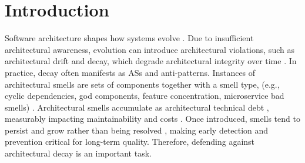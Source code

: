 \section{Introduction}
\label{s:introduction}
Software architecture shapes how systems evolve \cite{bass_SoftwareArchitecture_2021,woods_ContinuousArchitecture_2021,bogner_assuring_2019,garlan_evolution_2009,muccini_software_2021,breivold_systematic_2012}.
Due to insufficient architectural awareness, evolution can introduce architectural violations, such as architectural drift and decay, which degrade architectural integrity over time \cite{decay_icsa18,woods_ContinuousArchitecture_2021,ford_SoftwareArchitecture_2021}.  
In practice, decay often manifests as \aclp{AS} and anti-patterns. 
Instances of architectural smells are sets of components together with a smell type, (e.g., cyclic dependencies, god components, feature concentration, microservice bad smells) \cite{fontana_2017,taibi_DefinitionMicroservice_2018,ntentos_2023}.
Architectural smells accumulate as architectural technical debt \cite{li_SystematicMapping_2015}, measurably impacting maintainability and costs \cite{sas_ArchitecturalTechnical_2023,ampatzoglou_FinancialAspect_2015,martini_ArchitectureTechnical_2014,taibi_DefinitionMicroservice_2018,kazman_case_2015,xiao_identifying_2016}.
Once introduced, smells tend to persist and grow rather than being resolved \cite{sas_investigating_2019,sas_2022_evolution}, making early detection and prevention critical for long-term quality.
Therefore, defending against architectural decay is an important task.


